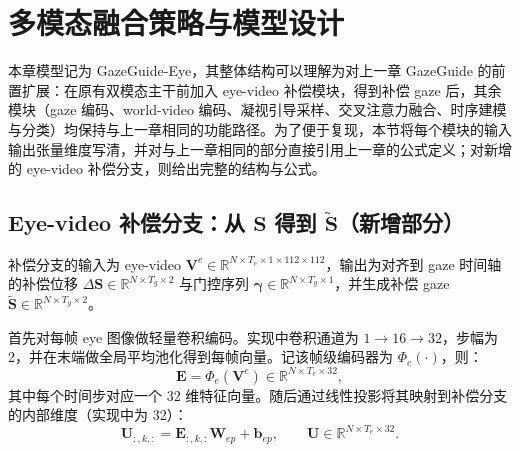 \documentclass{xdupgthesis}
\newcommand{\ModelMM}{GazeGuide}
\begin{document}
\section{多模态融合策略与模型设计}

本章模型记为 \ModelMM{}-Eye，其整体结构可以理解为对上一章 \ModelMM{} 的前置扩展：在原有双模态主干前加入 eye-video 补偿模块，得到补偿 gaze 后，其余模块（gaze 编码、world-video 编码、凝视引导采样、交叉注意力融合、时序建模与分类）均保持与上一章相同的功能路径。为了便于复现，本节将每个模块的输入输出张量维度写清，并对与上一章相同的部分直接引用上一章的公式定义；对新增的 eye-video 补偿分支，则给出完整的结构与公式。

\subsection{Eye-video 补偿分支：从 $\mathbf{S}$ 得到 $\tilde{\mathbf{S}}$（新增部分）}

补偿分支的输入为 eye-video $\mathbf{V}^e\in\mathbb{R}^{N\times T_e\times 1\times 112\times 112}$，输出为对齐到 gaze 时间轴的补偿位移 $\Delta\mathbf{S}\in\mathbb{R}^{N\times T_g\times 2}$ 与门控序列 $\boldsymbol{\gamma}\in\mathbb{R}^{N\times T_g\times 1}$，并生成补偿 gaze $\tilde{\mathbf{S}}\in\mathbb{R}^{N\times T_g\times 2}$。

首先对每帧 eye 图像做轻量卷积编码。实现中卷积通道为 $1\!\rightarrow\!16\!\rightarrow\!32$，步幅为 2，并在末端做全局平均池化得到每帧向量。记该帧级编码器为 $\Phi_e(\cdot)$，则：
\begin{equation}
\mathbf{E}=\Phi_e(\mathbf{V}^e)\in\mathbb{R}^{N\times T_e\times 32},
\end{equation}
其中每个时间步对应一个 32 维特征向量。随后通过线性投影将其映射到补偿分支的内部维度（实现中为 32）：
\begin{equation}
\mathbf{U}_{:,k,:}=\mathbf{E}_{:,k,:}\mathbf{W}_{ep}+\mathbf{b}_{ep},\qquad
\mathbf{U}\in\mathbb{R}^{N\times T_e\times 32}.
\end{equation}
\end{document}
